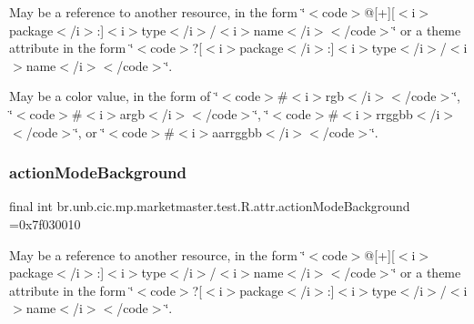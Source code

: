 May be a reference to another resource, in the form \char`\"{}$<$code$>$@\mbox{[}+\mbox{]}\mbox{[}$<$i$>$package$<$/i$>$\+:\mbox{]}$<$i$>$type$<$/i$>$/$<$i$>$name$<$/i$>$$<$/code$>$\char`\"{} or a theme attribute in the form \char`\"{}$<$code$>$?\mbox{[}$<$i$>$package$<$/i$>$\+:\mbox{]}$<$i$>$type$<$/i$>$/$<$i$>$name$<$/i$>$$<$/code$>$\char`\"{}. 

May be a color value, in the form of \char`\"{}$<$code$>$\#$<$i$>$rgb$<$/i$>$$<$/code$>$\char`\"{}, \char`\"{}$<$code$>$\#$<$i$>$argb$<$/i$>$$<$/code$>$\char`\"{}, \char`\"{}$<$code$>$\#$<$i$>$rrggbb$<$/i$>$$<$/code$>$\char`\"{}, or \char`\"{}$<$code$>$\#$<$i$>$aarrggbb$<$/i$>$$<$/code$>$\char`\"{}. \mbox{\label{classbr_1_1unb_1_1cic_1_1mp_1_1marketmaster_1_1test_1_1R_1_1attr_ac8f2a1f56426d1a289f33878cc553a35}} 
\subsubsection{\texorpdfstring{action\+Mode\+Background}{actionModeBackground}}
{\footnotesize\ttfamily final int br.\+unb.\+cic.\+mp.\+marketmaster.\+test.\+R.\+attr.\+action\+Mode\+Background =0x7f030010\hspace{0.3cm}{\ttfamily [static]}}

May be a reference to another resource, in the form \char`\"{}$<$code$>$@\mbox{[}+\mbox{]}\mbox{[}$<$i$>$package$<$/i$>$\+:\mbox{]}$<$i$>$type$<$/i$>$/$<$i$>$name$<$/i$>$$<$/code$>$\char`\"{} or a theme attribute in the form \char`\"{}$<$code$>$?\mbox{[}$<$i$>$package$<$/i$>$\+:\mbox{]}$<$i$>$type$<$/i$>$/$<$i$>$name$<$/i$>$$<$/code$>$\char`\"{}. \mbox{\label{classbr_1_1unb_1_1cic_1_1mp_1_1marketmaster_1_1test_1_1R_1_1attr_ac5e643de6c5a1c2e7a7e014f5601ff1c}} 

